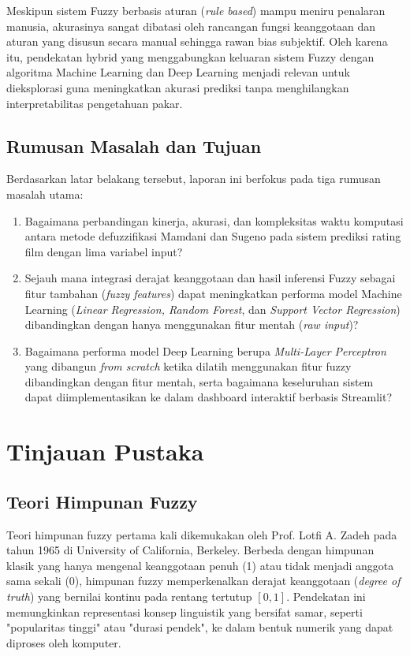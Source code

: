 \documentclass[11pt,a4paper]{article}
\begin{document}
Meskipun sistem Fuzzy berbasis aturan (\textit{rule based}) mampu meniru penalaran manusia, akurasinya sangat dibatasi oleh rancangan fungsi keanggotaan dan aturan yang disusun secara manual sehingga rawan bias subjektif. Oleh karena itu, pendekatan hybrid yang menggabungkan keluaran sistem Fuzzy dengan algoritma Machine Learning dan Deep Learning menjadi relevan untuk dieksplorasi guna meningkatkan akurasi prediksi tanpa menghilangkan interpretabilitas pengetahuan pakar.

\subsection{Rumusan Masalah dan Tujuan}
Berdasarkan latar belakang tersebut, laporan ini berfokus pada tiga rumusan masalah utama:
\begin{enumerate}
    \item Bagaimana perbandingan kinerja, akurasi, dan kompleksitas waktu komputasi antara metode defuzzifikasi Mamdani dan Sugeno pada sistem prediksi rating film dengan lima variabel input?
    \item Sejauh mana integrasi derajat keanggotaan dan hasil inferensi Fuzzy sebagai fitur tambahan (\textit{fuzzy features}) dapat meningkatkan performa model Machine Learning (\textit{Linear Regression, Random Forest}, dan \textit{Support Vector Regression}) dibandingkan dengan hanya menggunakan fitur mentah (\textit{raw input})?
    \item Bagaimana performa model Deep Learning berupa \textit{Multi-Layer Perceptron} yang dibangun \textit{from scratch} ketika dilatih menggunakan fitur fuzzy dibandingkan dengan fitur mentah, serta bagaimana keseluruhan sistem dapat diimplementasikan ke dalam dashboard interaktif berbasis Streamlit?
\end{enumerate}

\section{Tinjauan Pustaka}
\subsection{Teori Himpunan Fuzzy}
Teori himpunan fuzzy pertama kali dikemukakan oleh Prof. Lotfi A. Zadeh pada tahun 1965 di University of California, Berkeley. Berbeda dengan himpunan klasik yang hanya mengenal keanggotaan penuh (1) atau tidak menjadi anggota sama sekali (0), himpunan fuzzy memperkenalkan derajat keanggotaan (\textit{degree of truth}) yang bernilai kontinu pada rentang tertutup $[0, 1]$. Pendekatan ini memungkinkan representasi konsep linguistik yang bersifat samar, seperti "popularitas tinggi" atau "durasi pendek", ke dalam bentuk numerik yang dapat diproses oleh komputer.
\end{document}
